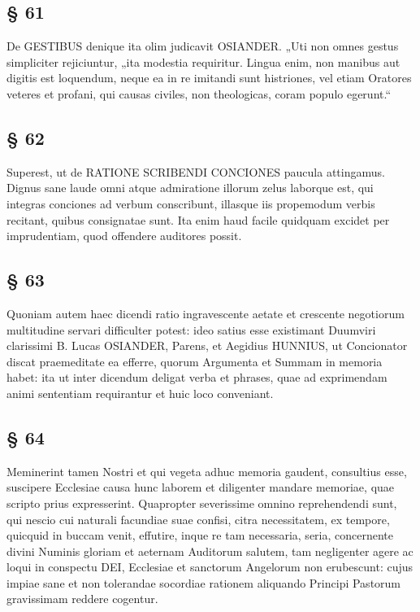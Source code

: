 \subsection{§ 61}

De GESTIBUS denique ita olim judicavit OSIANDER. „Uti non omnes gestus simpliciter rejiciuntur, „ita modestia requiritur. Lingua enim, non manibus aut digitis est loquendum, neque ea in re imitandi sunt histriones, vel etiam Oratores veteres et profani, qui causas civiles, non theologicas, coram populo egerunt.“

\subsection{§ 62}

Superest, ut de RATIONE SCRIBENDI CONCIONES paucula attingamus. Dignus sane laude omni atque admiratione illorum zelus laborque est, qui integras conciones ad verbum conscribunt, illasque iis propemodum verbis recitant, quibus consignatae sunt. Ita enim haud facile quidquam excidet per imprudentiam, quod offendere auditores possit.

\subsection{§ 63}

Quoniam autem haec dicendi ratio ingravescente aetate et crescente negotiorum multitudine servari difficulter potest: ideo satius esse existimant Duumviri clarissimi B. Lucas OSIANDER, Parens, et Aegidius HUNNIUS, ut Concionator discat praemeditate ea efferre, quorum Argumenta et Summam in memoria habet: ita ut inter dicendum deligat verba et phrases, quae ad exprimendam animi sententiam requirantur et huic loco conveniant.

\subsection{§ 64}

Meminerint tamen Nostri et qui vegeta adhuc memoria gaudent, consultius esse, suscipere Ecclesiae causa hunc laborem et diligenter mandare memoriae, quae scripto prius expresserint. Quapropter severissime
omnino reprehendendi sunt, qui nescio cui naturali facundiae suae confisi, citra necessitatem, ex tempore, quicquid in buccam venit, effutire, inque re tam necessaria, seria, concernente divini Numinis gloriam et aeternam Auditorum salutem, tam negligenter agere ac loqui in conspectu DEI, Ecclesiae et sanctorum Angelorum non erubescunt: cujus impiae sane et non tolerandae socordiae rationem aliquando Principi Pastorum gravissimam reddere cogentur.

